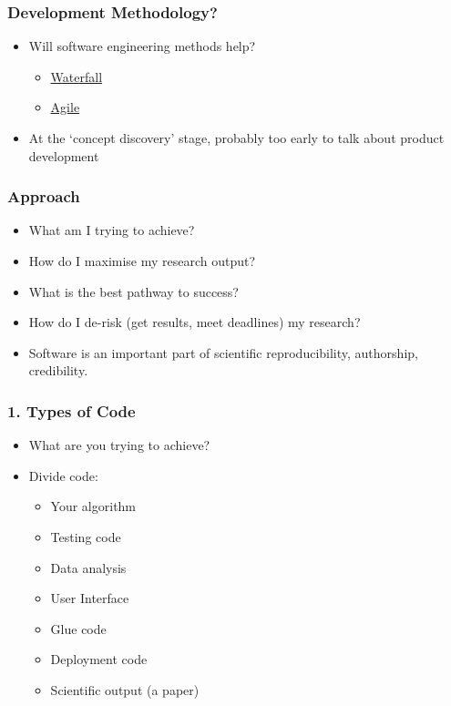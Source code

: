 \subsubsection{Development Methodology?}\label{development-methodology}

\begin{itemize}
\itemsep1pt\parskip0pt
\item
  Will software engineering methods help?

  \begin{itemize}
  \itemsep1pt\parskip0pt
  \item
    \href{https://en.wikipedia.org/wiki/Waterfall_model}{Waterfall}
  \item
    \href{https://en.wikipedia.org/wiki/Agile_software_development}{Agile}
  \end{itemize}
\item
  At the `concept discovery' stage, probably too early to talk about
  product development
\end{itemize}

\subsubsection{Approach}\label{approach}

\begin{itemize}
\itemsep1pt\parskip0pt
\item
  What am I trying to achieve?
\item
  How do I maximise my research output?
\item
  What is the best pathway to success?
\item
  How do I de-risk (get results, meet deadlines) my research?
\item
  Software is an important part of scientific reproducibility,
  authorship, credibility.
\end{itemize}

\subsubsection{1. Types of Code}\label{types-of-code}

\begin{itemize}
\itemsep1pt\parskip0pt
\item
  What are you trying to achieve?
\item
  Divide code:

  \begin{itemize}
  \itemsep1pt\parskip0pt
  \item
    Your algorithm
  \item
    Testing code
  \item
    Data analysis
  \item
    User Interface
  \item
    Glue code
  \item
    Deployment code
  \item
    Scientific output (a paper)
  \end{itemize}
\end{itemize}


